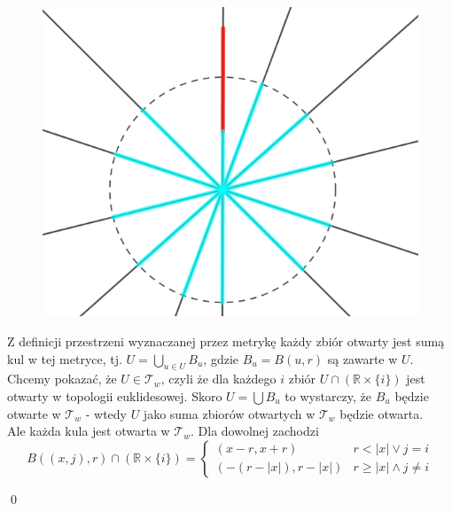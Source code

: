 \documentclass{article}
\theoremstyle{definition}%
\theoremstyle{theorem}
\renewenvironment{proof}{{\bfseries Rozwiązanie \\}}{\qed}
\newcommand{\R}{\mathbb{R}} %
\newcommand{\sT}{\mathcal{T}} %
\begin{document}
\begin{proof}
\begin{enumerate}
\begin{enumerate}
		 	\begin{figure}[H]
		 		\includegraphics{zad_toposlaba2}
		 		\centering
		 	\end{figure}
		 		\end{enumerate}
		 		Z definicji przestrzeni wyznaczanej przez metrykę każdy zbiór otwarty jest sumą kul w tej metryce, tj. $U=\bigcup_{u\in U } B_u$, gdzie $B_u = B(u,r)$ są zawarte w $U$. \\
		 		Chcemy pokazać, że $U\in \sT_w$, czyli że dla każdego $i$ zbiór $U\cap \left( \R\times\{i\}\right)$ jest otwarty w topologii euklidesowej. Skoro $U = \bigcup B_u$ to wystarczy, że $B_u$ będzie otwarte w $\sT_w$ - wtedy $U$ jako suma zbiorów otwartych w $\sT_w$ będzie otwarta. \\
		 		Ale każda kula jest otwarta w $\sT_w$. Dla dowolnej zachodzi 
		 		\[
		 		B((x,j),r) \cap \left(\R \times \{i\}\right) = \begin{cases}
		 		(x-r,x+r) & r < |x| \vee j = i \\
		 		(-(r-|x|),r-|x|) & r \geq |x| \wedge j \neq i
		 		

\end{cases}\]
\end{enumerate}
\end{proof}
\end{document}
